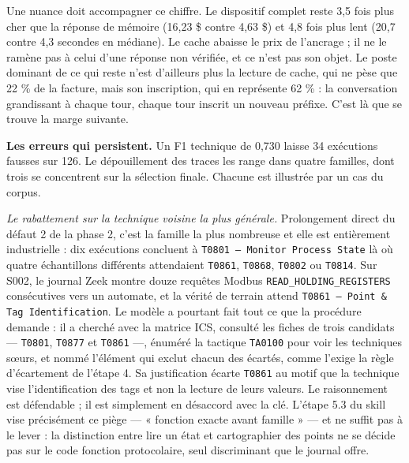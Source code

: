 Une nuance doit accompagner ce chiffre. Le dispositif complet reste 3,5 fois plus cher que la réponse de mémoire (16,23 \$ contre 4,63 \$) et 4,8 fois plus lent (20,7 contre 4,3 secondes en médiane). Le cache abaisse le prix de l'ancrage ; il ne le ramène pas à celui d'une réponse non vérifiée, et ce n'est pas son objet. Le poste dominant de ce qui reste n'est d'ailleurs plus la lecture de cache, qui ne pèse que 22 \% de la facture, mais son inscription, qui en représente 62 \% : la conversation grandissant à chaque tour, chaque tour inscrit un nouveau préfixe. C'est là que se trouve la marge suivante.

\textbf{Les erreurs qui persistent.} Un F1 technique de 0,730 laisse 34 exécutions fausses sur 126. Le dépouillement des traces les range dans quatre familles, dont trois se concentrent sur la sélection finale. Chacune est illustrée par un cas du corpus.

\emph{Le rabattement sur la technique voisine la plus générale.} Prolongement direct du défaut 2 de la phase 2, c'est la famille la plus nombreuse et elle est entièrement industrielle : dix exécutions concluent à \texttt{T0801 --- Monitor Process State} là où quatre échantillons différents attendaient \texttt{T0861}, \texttt{T0868}, \texttt{T0802} ou \texttt{T0814}. Sur S002, le journal Zeek montre douze requêtes Modbus \texttt{READ\_HOLDING\_REGISTERS} consécutives vers un automate, et la vérité de terrain attend \texttt{T0861 --- Point \& Tag Identification}. Le modèle a pourtant fait tout ce que la procédure demande : il a cherché avec la matrice ICS, consulté les fiches de trois candidats --- \texttt{T0801}, \texttt{T0877} et \texttt{T0861} ---, énuméré la tactique \texttt{TA0100} pour voir les techniques sœurs, et nommé l'élément qui exclut chacun des écartés, comme l'exige la règle d'écartement de l'étape 4. Sa justification écarte \texttt{T0861} au motif que la technique vise l'identification des tags et non la lecture de leurs valeurs. Le raisonnement est défendable ; il est simplement en désaccord avec la clé. L'étape 5.3 du skill vise précisément ce piège --- « fonction exacte avant famille » --- et ne suffit pas à le lever : la distinction entre lire un état et cartographier des points ne se décide pas sur le code fonction protocolaire, seul discriminant que le journal offre.

